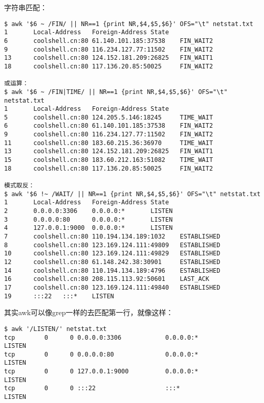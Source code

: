 字符串匹配：
\begin{verbatim}
$ awk '$6 ~ /FIN/ || NR==1 {print NR,$4,$5,$6}' OFS="\t" netstat.txt
1       Local-Address   Foreign-Address State
6       coolshell.cn:80 61.140.101.185:37538    FIN_WAIT2
9       coolshell.cn:80 116.234.127.77:11502    FIN_WAIT2
13      coolshell.cn:80 124.152.181.209:26825   FIN_WAIT1
18      coolshell.cn:80 117.136.20.85:50025     FIN_WAIT2

或运算：
$ awk '$6 ~ /FIN|TIME/ || NR==1 {print NR,$4,$5,$6}' OFS="\t" netstat.txt
1       Local-Address   Foreign-Address State
5       coolshell.cn:80 124.205.5.146:18245     TIME_WAIT
6       coolshell.cn:80 61.140.101.185:37538    FIN_WAIT2
9       coolshell.cn:80 116.234.127.77:11502    FIN_WAIT2
11      coolshell.cn:80 183.60.215.36:36970     TIME_WAIT
13      coolshell.cn:80 124.152.181.209:26825   FIN_WAIT1
15      coolshell.cn:80 183.60.212.163:51082    TIME_WAIT
18      coolshell.cn:80 117.136.20.85:50025     FIN_WAIT2

模式取反：
$ awk '$6 !~ /WAIT/ || NR==1 {print NR,$4,$5,$6}' OFS="\t" netstat.txt
1       Local-Address   Foreign-Address State
2       0.0.0.0:3306    0.0.0.0:*       LISTEN
3       0.0.0.0:80      0.0.0.0:*       LISTEN
4       127.0.0.1:9000  0.0.0.0:*       LISTEN
7       coolshell.cn:80 110.194.134.189:1032    ESTABLISHED
8       coolshell.cn:80 123.169.124.111:49809   ESTABLISHED
10      coolshell.cn:80 123.169.124.111:49829   ESTABLISHED
12      coolshell.cn:80 61.148.242.38:30901     ESTABLISHED
14      coolshell.cn:80 110.194.134.189:4796    ESTABLISHED
16      coolshell.cn:80 208.115.113.92:50601    LAST_ACK
17      coolshell.cn:80 123.169.124.111:49840   ESTABLISHED
19      :::22   :::*    LISTEN
\end{verbatim}

其实awk可以像grep一样的去匹配第一行，就像这样：
\begin{verbatim}
$ awk '/LISTEN/' netstat.txt
tcp        0      0 0.0.0.0:3306            0.0.0.0:*               LISTEN
tcp        0      0 0.0.0.0:80              0.0.0.0:*               LISTEN
tcp        0      0 127.0.0.1:9000          0.0.0.0:*               LISTEN
tcp        0      0 :::22                   :::*                    LISTEN
\end{verbatim}

